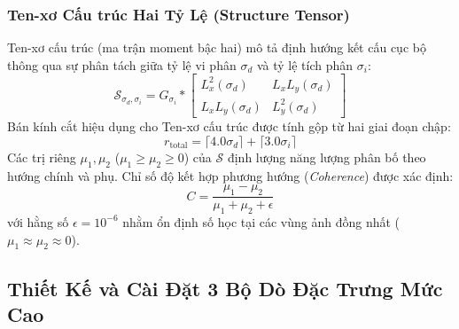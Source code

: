 \subsubsection{Ten-xơ Cấu trúc Hai Tỷ Lệ (Structure Tensor)}
Ten-xơ cấu trúc (ma trận moment bậc hai) mô tả định hướng kết cấu cục bộ thông qua sự phân tách giữa tỷ lệ vi phân $\sigma_d$ và tỷ lệ tích phân $\sigma_i$:
\begin{equation}
\mathcal{S}_{\sigma_d, \sigma_i} = G_{\sigma_i} * \begin{bmatrix} L_x^2(\sigma_d) & L_x L_y(\sigma_d) \\ L_x L_y(\sigma_d) & L_y^2(\sigma_d) \end{bmatrix}
\end{equation}
Bán kính cắt hiệu dụng cho Ten-xơ cấu trúc được tính gộp từ hai giai đoạn chập:
\begin{equation}
r_{\text{total}} = \lceil 4.0 \sigma_d \rceil + \lceil 3.0 \sigma_i \rceil
\end{equation}
Các trị riêng $\mu_1, \mu_2$ ($\mu_1 \ge \mu_2 \ge 0$) của $\mathcal{S}$ định lượng năng lượng phân bố theo hướng chính và phụ. Chỉ số độ kết hợp phương hướng (\textit{Coherence}) được xác định:
\begin{equation}
C = \frac{\mu_1 - \mu_2}{\mu_1 + \mu_2 + \epsilon}
\end{equation}
với hằng số $\epsilon = 10^{-6}$ nhằm ổn định số học tại các vùng ảnh đồng nhất ($\mu_1 \approx \mu_2 \approx 0$).

\subsection{Thiết Kế và Cài Đặt 3 Bộ Dò Đặc Trưng Mức Cao}

